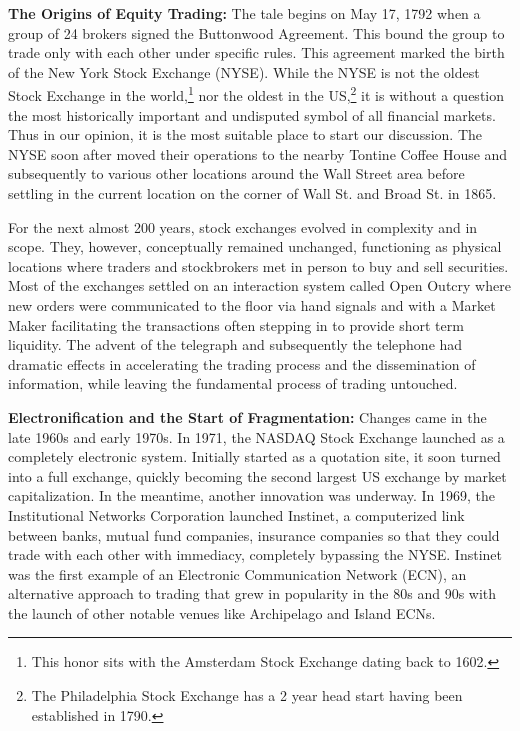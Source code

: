 \noindent\textbf{The Origins of Equity Trading:} The tale begins on May 17, 1792 when a group of 24 brokers signed the Buttonwood Agreement. This bound the group to trade only with each other under specific rules. This agreement marked the birth of the New York Stock Exchange (NYSE). While the NYSE is not the oldest Stock Exchange in the world,\footnote{This honor sits with the Amsterdam Stock Exchange dating back to 1602.} nor the oldest in the US,\footnote{The Philadelphia Stock Exchange has a 2 year head start having been established in 1790.} it is without a question the most historically important and undisputed symbol of all financial markets. Thus in our opinion, it is the most suitable place to start our discussion. The NYSE soon after moved their operations to the nearby Tontine Coffee House and subsequently to various other locations around the Wall Street area before settling in the current location on the corner of Wall St. and Broad St. in 1865.


For the next almost 200 years, stock exchanges evolved in complexity and in scope. They, however, conceptually remained unchanged, functioning as physical locations where traders and stockbrokers met in person to buy and sell securities. Most of the exchanges settled on an interaction system called Open Outcry where new orders were communicated to the floor via hand signals and with a Market Maker facilitating the transactions often stepping in to provide short term liquidity. The advent of the telegraph and subsequently the telephone had dramatic effects in accelerating the trading process and the dissemination of information, while leaving the fundamental process of trading untouched. \twomedskip


\noindent\textbf{Electronification and the Start of Fragmentation:} Changes came in the late 1960s and early 1970s. In 1971, the NASDAQ Stock Exchange launched as a completely electronic system. Initially started as a quotation site, it soon turned into a full exchange, quickly becoming the second largest US exchange by market capitalization. In the meantime, another innovation was underway. In 1969, the Institutional Networks Corporation launched Instinet, a computerized link between banks, mutual fund companies, insurance companies so that they could trade with each other with immediacy, completely bypassing the NYSE. Instinet was the first example of an Electronic Communication Network (ECN), an alternative approach to trading that grew in popularity in the 80s and 90s with the launch of other notable venues like Archipelago and Island ECNs.


